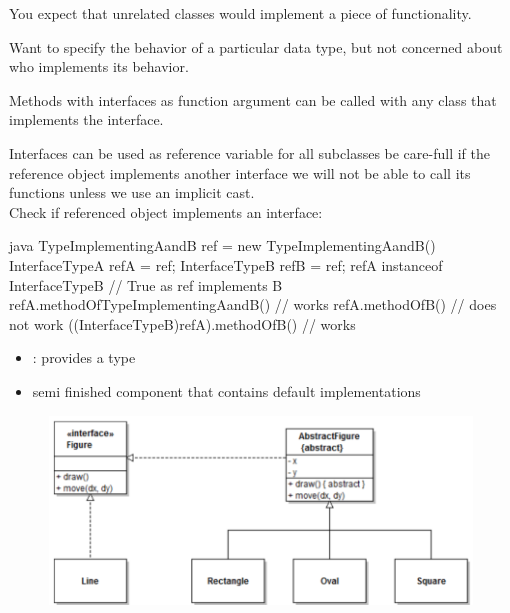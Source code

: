 \begin{stylebox}[Usage]\nospacing
  \begin{itemizenosep}
    \item You expect that unrelated classes would implement a piece of
  functionality. 
    \item Want to specify the behavior of a particular data type, but not concerned about who implements its behavior.
  \end{itemizenosep}
\end{stylebox}
\begin{notebox}\nospacing
  Methods with interfaces as function argument can be called with any class that
  implements the interface.
\end{notebox}
\begin{notebox}\nospacing
  Interfaces can be used as reference variable for all subclasses  be
  care-full if the reference object implements another interface we will not be
  able to call its functions unless we use an implicit cast.\\
  Check if referenced object implements an interface: 
\end{notebox}
\begin{codeboxNl}{java}
  TypeImplementingAandB ref = new TypeImplementingAandB()
  InterfaceTypeA refA = ref;
  InterfaceTypeB refB = ref;
  refA instanceof InterfaceTypeB // True as ref implements B
  refA.methodOfTypeImplementingAandB() // works
  refA.methodOfB() // does not work
  ((InterfaceTypeB)refA).methodOfB() // works
\end{codeboxNl}
\begin{sectionbox}\nospacing
  \begin{itemize}
      \item {}: provides a type
      \item {} semi finished component that contains
    default implementations
  \end{itemize}
  \begin{figure}[H]
    \centering
    \includegraphics[width=1.0\textwidth]{java/figures/oop/abstractInterface.png}
  \end{figure}
\end{sectionbox}
